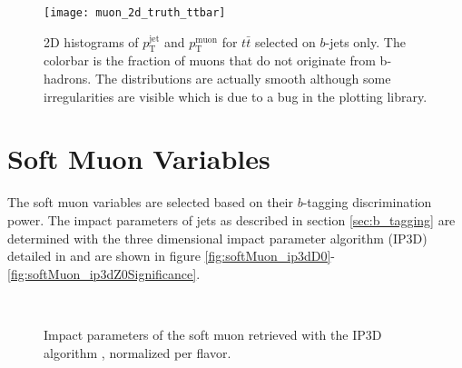 \begin{figure}[htbp]
  \texttt{[image: muon\_2d\_truth\_ttbar]}
  \caption{2D histograms of $p_\mathrm{T}^\mathrm{jet}$ and $p_\mathrm{T}^\mathrm{muon}$ for $t\bar{t}$ selected on $b$-jets only. The colorbar is the fraction of muons that do not originate from b-hadrons. The distributions are actually smooth although some irregularities are visible which is due to a bug in the plotting library.}
  \label{fig:muon_2d_truth}
\end{figure}



\section{Soft Muon Variables}
\label{sec:SoftMuonVariables}
The soft muon variables are selected based on their $b$-tagging discrimination power. The impact parameters of jets as described in section \ref{sec:b_tagging} are determined with the three dimensional impact parameter algorithm (IP3D) detailed in \citep{ATL-PHYS-PUB-2017-013} and are shown in figure \ref{fig:softMuon_ip3dD0}-\ref{fig:softMuon_ip3dZ0Significance}.
\begin{figure}[htbp]
  \centering
    \\
  \caption{Impact parameters of the soft muon retrieved with the IP3D algorithm \citep{ATL-PHYS-PUB-2017-013}, normalized per flavor.}
  \label{fig:softMuonKinematics}
\end{figure}
